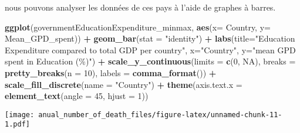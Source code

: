 \documentclass[
]{article}
\newenvironment{Shaded}{\begin{snugshade}}{\end{snugshade}}
\newcommand{\AttributeTok}[1]{\textcolor[rgb]{0.13,0.29,0.53}{#1}}
\newcommand{\ConstantTok}[1]{\textcolor[rgb]{0.56,0.35,0.01}{#1}}
\newcommand{\DecValTok}[1]{\textcolor[rgb]{0.00,0.00,0.81}{#1}}
\newcommand{\FunctionTok}[1]{\textcolor[rgb]{0.13,0.29,0.53}{\textbf{#1}}}
\newcommand{\NormalTok}[1]{#1}
\newcommand{\SpecialCharTok}[1]{\textcolor[rgb]{0.81,0.36,0.00}{\textbf{#1}}}
\newcommand{\StringTok}[1]{\textcolor[rgb]{0.31,0.60,0.02}{#1}}
\begin{document}
nous pouvons analyser les données de ces pays à l'aide de graphes à
barres.

\begin{Shaded}
\begin{Highlighting}[]
\FunctionTok{ggplot}\NormalTok{(governmentEducationExpenditure\_minmax, }\FunctionTok{aes}\NormalTok{(}\AttributeTok{x=}\NormalTok{ Country, }\AttributeTok{y=} \StringTok{\textasciigrave{}}\AttributeTok{Mean\_GPD\_spent}\StringTok{\textasciigrave{}}\NormalTok{)) }\SpecialCharTok{+} \FunctionTok{geom\_bar}\NormalTok{(}\AttributeTok{stat =} \StringTok{"identity"}\NormalTok{) }\SpecialCharTok{+} \FunctionTok{labs}\NormalTok{(}\AttributeTok{title=}\StringTok{"Education Expenditure compared to total GDP per country"}\NormalTok{, }\AttributeTok{x=}\StringTok{"Country"}\NormalTok{, }\AttributeTok{y=}\StringTok{"mean GPD spent in Education (\%)"}\NormalTok{) }\SpecialCharTok{+} \FunctionTok{scale\_y\_continuous}\NormalTok{(}\AttributeTok{limits =} \FunctionTok{c}\NormalTok{(}\DecValTok{0}\NormalTok{, }\ConstantTok{NA}\NormalTok{), }\AttributeTok{breaks =} \FunctionTok{pretty\_breaks}\NormalTok{(}\AttributeTok{n =} \DecValTok{10}\NormalTok{), }\AttributeTok{labels =} \FunctionTok{comma\_format}\NormalTok{()) }\SpecialCharTok{+} \FunctionTok{scale\_fill\_discrete}\NormalTok{(}\AttributeTok{name =} \StringTok{"Country"}\NormalTok{) }\SpecialCharTok{+} 
  \FunctionTok{theme}\NormalTok{(}\AttributeTok{axis.text.x =} \FunctionTok{element\_text}\NormalTok{(}\AttributeTok{angle =} \DecValTok{45}\NormalTok{, }\AttributeTok{hjust =} \DecValTok{1}\NormalTok{))  }
\end{Highlighting}
\end{Shaded}

\texttt{[image: anual\_number\_of\_death\_files/figure-latex/unnamed-chunk-11-1.pdf]}
\end{document}
